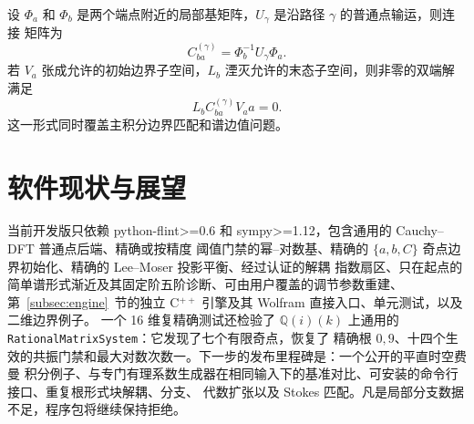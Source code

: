 \documentclass[11pt,a4paper]{ctexart}
\renewcommand{\_}{\origunderscore\allowbreak}
\begin{document}
设 $\Phi_a$ 和 $\Phi_b$ 是两个端点附近的局部基矩阵，$U_\gamma$ 是沿路径 $\gamma$ 的普通点输运，则连接
矩阵为
\begin{equation}
  C_{ba}^{(\gamma)}=\Phi_b^{-1}U_\gamma\Phi_a.
\end{equation}
若 $V_a$ 张成允许的初始边界子空间，$L_b$ 湮灭允许的末态子空间，则非零的双端解满足
\begin{equation}
  L_b C_{ba}^{(\gamma)}V_a a=0.
  \label{eq:two-end-condition}
\end{equation}
这一形式同时覆盖主积分边界匹配和谱边值问题。

\section{软件现状与展望}

当前开发版只依赖 python-flint>=0.6 和 sympy>=1.12，包含通用的 Cauchy--DFT 普通点后端、精确或按精度
阈值门禁的幂--对数基、精确的 $\{a,b,C\}$ 奇点边界初始化、精确的 Lee--Moser 投影平衡、经过认证的解耦
指数扇区、只在起点的简单谱形式渐近及其固定阶五阶诊断、可由用户覆盖的调节参数重建、
第~\ref{subsec:engine}~节的独立 C$^{++}$ 引擎及其 Wolfram 直接入口、单元测试，以及二维边界例子。
一个 16 维复精确测试还检验了 $\mathbb Q(i)(k)$ 上通用的
\texttt{Rational}\allowbreak\texttt{Matrix}\allowbreak\texttt{System}：它发现了七个有限奇点，恢复了
精确根 $0,9$、十四个生效的共振门禁和最大对数次数一。下一步的发布里程碑是：一个公开的平直时空费曼
积分例子、与专门有理系数生成器在相同输入下的基准对比、可安装的命令行接口、重复根形式块解耦、分支、
代数扩张以及 Stokes 匹配。凡是局部分支数据不足，程序包将继续保持拒绝。

\enlargethispage{1.5\baselineskip}


\end{document}
